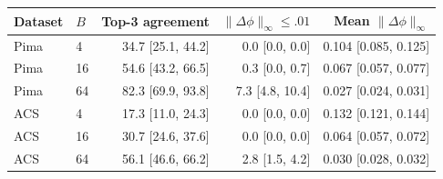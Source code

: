 \begin{tabular}{llrrr}
\toprule
Dataset & $B$ & Top-3 agreement & $\|\Delta\phi\|_\infty\leq .01$ & Mean $\|\Delta\phi\|_\infty$ \\
\midrule
Pima & 4 & 34.7 [25.1, 44.2] & 0.0 [0.0, 0.0] & 0.104 [0.085, 0.125] \\
Pima & 16 & 54.6 [43.2, 66.5] & 0.3 [0.0, 0.7] & 0.067 [0.057, 0.077] \\
Pima & 64 & 82.3 [69.9, 93.8] & 7.3 [4.8, 10.4] & 0.027 [0.024, 0.031] \\
ACS & 4 & 17.3 [11.0, 24.3] & 0.0 [0.0, 0.0] & 0.132 [0.121, 0.144] \\
ACS & 16 & 30.7 [24.6, 37.6] & 0.0 [0.0, 0.0] & 0.064 [0.057, 0.072] \\
ACS & 64 & 56.1 [46.6, 66.2] & 2.8 [1.5, 4.2] & 0.030 [0.028, 0.032] \\
\bottomrule
\end{tabular}